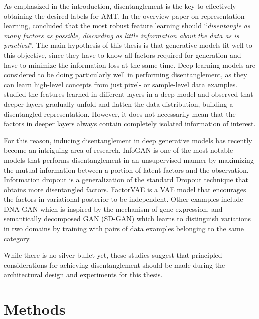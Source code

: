 As emphasized in the introduction, disentanglement is the key to effectively obtaining the desired labels for AMT.
In the overview paper on representation learning,  concluded that the most robust feature learning should ``\emph{disentangle as many factors as possible, discarding as little information about the data as is practical}''.
The main hypothesis of this thesis is that generative models fit well to this objective, since they have to know all factors required for generation and have to minimize the information loss at the same time.
Deep learning models are considered to be doing particularly well in performing disentanglement, as they can learn high-level concepts from just pixel- or sample-level data examples.
 studied the features learned in different layers in a deep model and observed that deeper layers gradually unfold and flatten the data distribution, building a disentangled representation.
However, it does not necessarily mean that the factors in deeper layers always contain completely isolated information of interest.

For this reason, inducing disentanglement in deep generative models has recently become an intriguing area of research.
InfoGAN \cite{chen2016infogan} is one of the most notable models that performs disentanglement in an unsupervised manner by maximizing the mutual information between a portion of latent factors and the observation.
Information dropout \cite{achille2018information} is a generalization of the standard Dropout technique that obtains more disentangled factors.
FactorVAE \cite{kim2018factor} is a VAE model that encourages the factors in variational posterior to be independent.
Other examples include DNA-GAN \cite{xiao2017dnagan} which is inspired by the mechanism of gene expression,
and semantically decomposed GAN (SD-GAN) \cite{donahue2017gan} which learns to distinguish variations in two domains by training with pairs of data examples belonging to the same category.

While there is no silver bullet yet, these studies suggest that principled considerations for achieving disentanglement should be made during the architectural design and experiments for this thesis.


\section{Methods}

